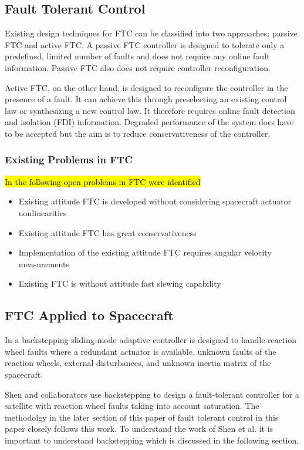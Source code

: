 \subsection{Fault Tolerant Control}
Existing design techniques for FTC can be classified into two approaches: passive FTC and active FTC. A passive FTC controller is designed to tolerate only a predefined, limited number of faults and does not require any online fault information. Passive FTC also does not require controller reconfiguration. \cite{yinReviewRecentDevelopment2016}

Active FTC, on the other hand, is designed to reconfigure the controller in the presence of a fault. It can achieve this through preselecting an existing control law or synthesizing a new control law. It therefore requires online fault detection and isolation (FDI) information. Degraded performance of the system does have to be accepted but the aim is to reduce conservativeness of the controller. \cite{yinReviewRecentDevelopment2016}
\subsubsection{Existing Problems in FTC}
\hl{In \mbox{\cite{yinReviewRecentDevelopment2016}} the following open problems in FTC were identified}
\begin{itemize}
\item Existing attitude FTC is developed without considering spacecraft actuator nonlinearities
\item Existing attitude FTC has great conservativeness
\item Implementation of the existing attitude FTC requires angular velocity measurements
\item Existing FTC is without attitude fast slewing capability
\end{itemize}

\subsection{FTC Applied to Spacecraft}
In \cite{jiangAdaptiveBacksteppingFaulttolerant2010} a backstepping sliding-mode adaptive controller is designed to handle reaction wheel faults where a redundant actuator is available. unknown faults of the reaction wheels, external disturbances, and unknown inertia matrix of the spacecraft. 

Shen and collaborators \cite{shenActiveFaulttolerantControl2019} use backstepping to design a fault-tolerant controller for a satellite with reaction wheel faults taking into account saturation. The methodolgy in the later section of this paper of fault tolerant control in this paper closely follows this work. To understand the work of Shen et al. \cite{shenActiveFaulttolerantControl2019} it is important to understand backstepping which is discussed in the following section.


